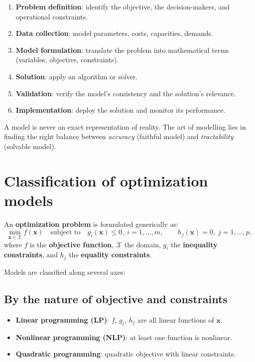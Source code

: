 \begin{enumerate}
  \item \textbf{Problem definition}: identify the objective, the
        decision-makers, and operational constraints.
  \item \textbf{Data collection}: model parameters, costs, capacities,
        demands.
  \item \textbf{Model formulation}: translate the problem into mathematical
        terms (variables, objective, constraints).
  \item \textbf{Solution}: apply an algorithm or solver.
  \item \textbf{Validation}: verify the model's consistency and the
        solution's relevance.
  \item \textbf{Implementation}: deploy the solution and monitor its
        performance.
\end{enumerate}

\begin{intuition}[title=\textbf{Modelling means simplifying}]
A model is never an exact representation of reality.  The art of modelling
lies in finding the right balance between \emph{accuracy} (faithful model)
and \emph{tractability} (solvable model).
\end{intuition}

\section{Classification of optimization models}

\begin{definition}
An \textbf{optimization problem} is formulated generically as:
\[
  \min_{\mathbf{x} \in \mathcal{X}} f(\mathbf{x})
  \quad \text{subject to} \quad
  g_i(\mathbf{x}) \le 0, \; i = 1, \ldots, m,
  \qquad
  h_j(\mathbf{x}) = 0, \; j = 1, \ldots, p,
\]
where $f$ is the \textbf{objective function}, $\mathcal{X}$ the domain,
$g_i$ the \textbf{inequality constraints}, and $h_j$ the
\textbf{equality constraints}.
\end{definition}

Models are classified along several axes:

\subsection{By the nature of objective and constraints}

\begin{itemize}
  \item \textbf{Linear programming (LP)}: $f$, $g_i$, $h_j$ are all linear
        functions of $\mathbf{x}$.
  \item \textbf{Nonlinear programming (NLP)}: at least one function is
        nonlinear.
  \item \textbf{Quadratic programming}: quadratic objective with linear
        constraints.
\end{itemize}

